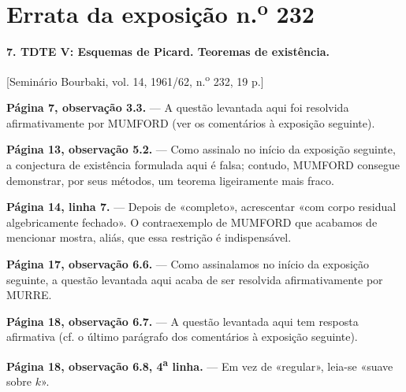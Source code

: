 \clearpage
\chapter*{Errata da exposição n.\textsuperscript{o} 232}

\noindent\textbf{7. TDTE V: Esquemas de Picard. Teoremas de existência.}

\begin{center}
[Seminário Bourbaki, vol. 14, 1961/62, n.\textsuperscript{o} 232, 19 p.]
\end{center}

\noindent\textbf{Página 7, observação 3.3.} --- A questão levantada aqui foi
resolvida afirmativamente por MUMFORD (ver os comentários à exposição seguinte).

\noindent\textbf{Página 13, observação 5.2.} --- Como assinalo no início da
exposição seguinte, a conjectura de existência formulada aqui é falsa; contudo,
MUMFORD consegue demonstrar, por seus métodos, um teorema ligeiramente mais
fraco.

\noindent\textbf{Página 14, linha 7.} --- Depois de «completo», acrescentar «com
corpo residual algebricamente fechado». O contraexemplo de MUMFORD que acabamos
de mencionar mostra, aliás, que essa restrição é indispensável.

\noindent\textbf{Página 17, observação 6.6.} --- Como assinalamos no início da
exposição seguinte, a questão levantada aqui acaba de ser resolvida
afirmativamente por MURRE.

\noindent\textbf{Página 18, observação 6.7.} --- A questão levantada aqui tem
resposta afirmativa (cf. o último parágrafo dos comentários à exposição
seguinte).

\noindent\textbf{Página 18, observação 6.8, 4\textsuperscript{a} linha.} --- Em vez de
«regular», leia-se «suave sobre $k$».

\par
